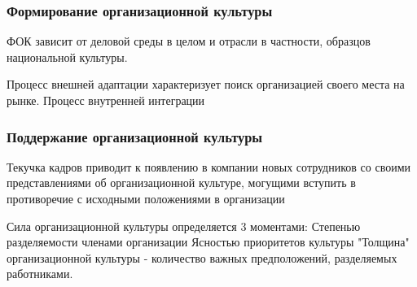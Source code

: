 \documentclass[a4paper,12pt]{report}
\begin{document}
	\subsubsection{Формирование организационной культуры}
	ФОК зависит от деловой среды в целом и отрасли в частности, образцов национальной культуры.
	
	Процесс внешней адаптации характеризует поиск организацией своего места на рынке.
	Процесс внутренней интеграции

	\subsubsection{Поддержание организационной культуры}
	
	Текучка кадров приводит к появлению в компании новых сотрудников со своими представлениями об организационной
	 культуре, могущими вступить в противоречие с исходными положениями в организации
	
	Сила организационной культуры определяется 3 моментами:
		Степенью разделяемости членами организации
		Ясностью приоритетов культуры
		"Толщина" организационной культуры - количество важных предположений, разделяемых работниками.
		

\end{document}
